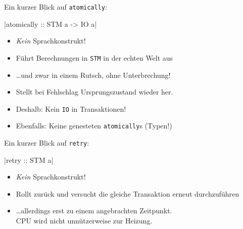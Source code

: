 \documentclass{beamer}
\begin{document}
\begin{frame}[fragile]

Ein kurzer Blick auf \texttt{atomically}:

|atomically :: STM a -> IO a|
\pause

\begin{itemize}
\item \emph{Kein} Sprachkonstrukt!\pause
\item Führt Berechnungen in \texttt{STM} in der echten Welt aus\pause
\item \dots und zwar in einem Rutsch, ohne Unterbrechung!\pause
\item Stellt bei Fehlschlag Ursprungszustand wieder her.\pause
\item Deshalb: Kein \texttt{IO} in Transaktionen!\pause
\item Ebenfalls: Keine genesteten \texttt{atomically}s (Typen!) 
\end{itemize}
\end{frame}


\begin{frame}[fragile]

Ein kurzer Blick auf \texttt{retry}:

|retry :: STM a|
\pause

\begin{itemize}
\item \emph{Kein} Sprachkonstrukt!\pause
\item Rollt zurück und versucht die gleiche Transaktion erneut durchzuführen\pause
\item \dots allerdings erst zu einem angebrachten Zeitpunkt.\\ CPU wird nicht unnützerweise zur Heizung.\pause
\end{itemize}
\end{frame}

\end{document}
